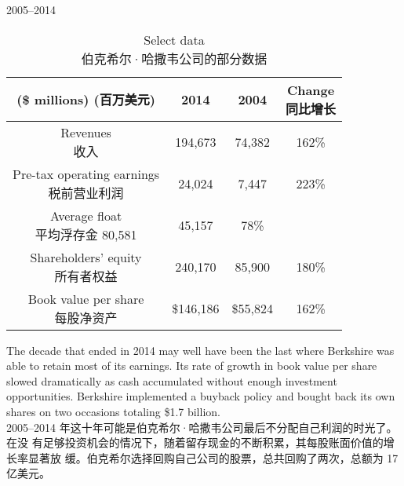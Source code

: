 \begin{section}{2005--2014}

\begin{table}[!htbp]
  \centering
  \begin{center}
    \begin{tabular}{cccc}
      \toprule
      \makecell[c]{(\$ millions) \\ (百万美元)} & 2014 & 2004 & \makecell[c]{Change \\ 同比增长} \\
      \midrule
      \makecell[c]{Revenues \\ 收入} & 194,673 & 74,382 & 162\% \\
      \makecell[c]{Pre-tax operating earnings \\ 税前营业利润} & 24,024 & 7,447 & 223\% \\
      \makecell[c]{Average float \\ 平均浮存金} 80,581 & 45,157 & 78\% \\
      \makecell[c]{Shareholders' equity \\ 所有者权益} & 240,170 & 85,900 & 180\% \\
      \makecell[c]{Book value per share \\ 每股净资产} & \$146,186 & \$55,824 & 162\% \\
      \bottomrule
    \end{tabular}
    \caption{Select data \\ 伯克希尔·哈撒韦公司的部分数据}
  \end{center}
\end{table}

\begin{verseparallel}
  {
    The decade that ended in 2014 may well have been the last where Berkshire
    was able to retain most of its earnings. Its rate of growth in book value
    per share slowed dramatically as cash accumulated without enough investment
    opportunities. Berkshire implemented a buyback policy and bought back its
    own shares on two occasions totaling \$1.7 billion. \\
  }
  {
    2005--2014 年这十年可能是伯克希尔·哈撒韦公司最后不分配自己利润的时光了。在没
    有足够投资机会的情况下，随着留存现金的不断积累，其每股账面价值的增长率显著放
    缓。伯克希尔选择回购自己公司的股票，总共回购了两次，总额为 17 亿美元。
  }
\end{verseparallel}


\end{section}
